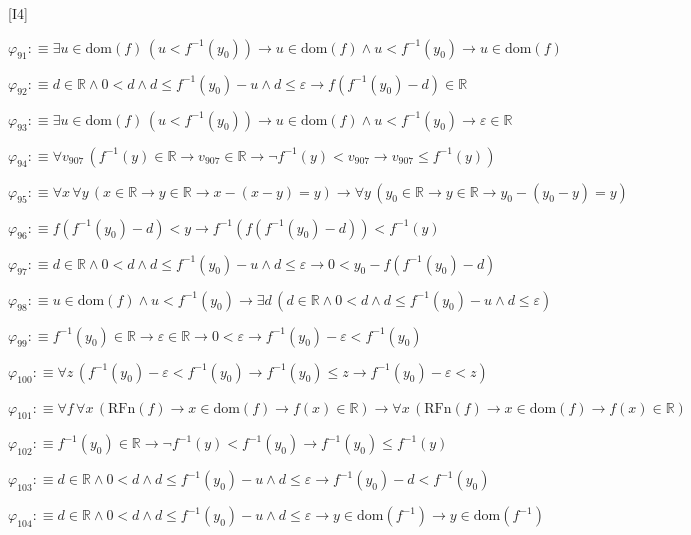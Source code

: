 \begin{fullproof}{[I4]}
\begin{abbrevlist}
\item $\varphi_{91} :\equiv \exists u \in \mathrm{dom}(f)\,(u < f^{-1}(y_{0})) \to u \in \mathrm{dom}(f) \land u < f^{-1}(y_{0}) \to u \in \mathrm{dom}(f)$
\item $\varphi_{92} :\equiv d \in \mathbb{R} \land 0 < d \land d \leq f^{-1}(y_{0}) - u \land d \leq \varepsilon \to f(f^{-1}(y_{0}) - d) \in \mathbb{R}$
\item $\varphi_{93} :\equiv \exists u \in \mathrm{dom}(f)\,(u < f^{-1}(y_{0})) \to u \in \mathrm{dom}(f) \land u < f^{-1}(y_{0}) \to \varepsilon \in \mathbb{R}$
\item $\varphi_{94} :\equiv \forall v_{907}\,(f^{-1}(y) \in \mathbb{R} \to v_{907} \in \mathbb{R} \to \neg f^{-1}(y) < v_{907} \to v_{907} \leq f^{-1}(y))$
\item $\varphi_{95} :\equiv \forall x\,\forall y\,(x \in \mathbb{R} \to y \in \mathbb{R} \to x - (x - y) = y) \to \forall y\,(y_{0} \in \mathbb{R} \to y \in \mathbb{R} \to y_{0} - (y_{0} - y) = y)$
\item $\varphi_{96} :\equiv f(f^{-1}(y_{0}) - d) < y \to f^{-1}(f(f^{-1}(y_{0}) - d)) < f^{-1}(y)$
\item $\varphi_{97} :\equiv d \in \mathbb{R} \land 0 < d \land d \leq f^{-1}(y_{0}) - u \land d \leq \varepsilon \to 0 < y_{0} - f(f^{-1}(y_{0}) - d)$
\item $\varphi_{98} :\equiv u \in \mathrm{dom}(f) \land u < f^{-1}(y_{0}) \to \exists d\,(d \in \mathbb{R} \land 0 < d \land d \leq f^{-1}(y_{0}) - u \land d \leq \varepsilon)$
\item $\varphi_{99} :\equiv f^{-1}(y_{0}) \in \mathbb{R} \to \varepsilon \in \mathbb{R} \to 0 < \varepsilon \to f^{-1}(y_{0}) - \varepsilon < f^{-1}(y_{0})$
\item $\varphi_{100} :\equiv \forall z\,(f^{-1}(y_{0}) - \varepsilon < f^{-1}(y_{0}) \to f^{-1}(y_{0}) \leq z \to f^{-1}(y_{0}) - \varepsilon < z)$
\item $\varphi_{101} :\equiv \forall f\,\forall x\,(\mathrm{RFn}(f) \to x \in \mathrm{dom}(f) \to f(x) \in \mathbb{R}) \to \forall x\,(\mathrm{RFn}(f) \to x \in \mathrm{dom}(f) \to f(x) \in \mathbb{R})$
\item $\varphi_{102} :\equiv f^{-1}(y_{0}) \in \mathbb{R} \to \neg f^{-1}(y) < f^{-1}(y_{0}) \to f^{-1}(y_{0}) \leq f^{-1}(y)$
\item $\varphi_{103} :\equiv d \in \mathbb{R} \land 0 < d \land d \leq f^{-1}(y_{0}) - u \land d \leq \varepsilon \to f^{-1}(y_{0}) - d < f^{-1}(y_{0})$
\item $\varphi_{104} :\equiv d \in \mathbb{R} \land 0 < d \land d \leq f^{-1}(y_{0}) - u \land d \leq \varepsilon \to y \in \mathrm{dom}(f^{-1}) \to y \in \mathrm{dom}(f^{-1})$

\end{abbrevlist}
\end{fullproof}
